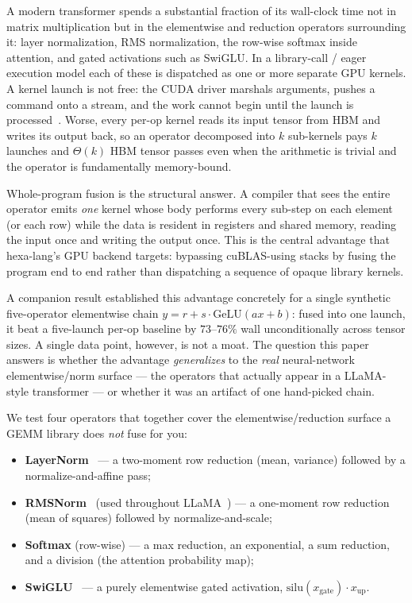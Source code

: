 \documentclass[11pt,a4paper]{article}
\begin{document}
A modern transformer spends a substantial fraction of its wall-clock time not
in matrix multiplication but in the elementwise and reduction operators
surrounding it: layer normalization, RMS normalization, the row-wise softmax
inside attention, and gated activations such as SwiGLU. In a library-call /
eager execution model each of these is dispatched as one or more separate GPU
kernels. A kernel launch is not free: the CUDA driver marshals arguments,
pushes a command onto a stream, and the work cannot begin until the launch is
processed~\citep{nvidia_cuda_driver}. Worse, every per-op kernel reads its
input tensor from HBM and writes its output back, so an operator decomposed
into $k$ sub-kernels pays $k$ launches and $\Theta(k)$ HBM tensor passes even
when the arithmetic is trivial and the operator is fundamentally
memory-bound.

Whole-program fusion is the structural answer. A compiler that sees the entire
operator emits \emph{one} kernel whose body performs every sub-step on each
element (or each row) while the data is resident in registers and shared
memory, reading the input once and writing the output once. This is the central
advantage that hexa-lang's GPU backend targets: bypassing cuBLAS-using stacks by
fusing the program end to end rather than dispatching a sequence of opaque
library kernels.

A companion result established this advantage concretely for a single synthetic
five-operator elementwise chain $y = r + s\cdot\mathrm{GeLU}(ax+b)$: fused into
one launch, it beat a five-launch per-op baseline by $73$--$76\%$ wall
unconditionally across tensor sizes. A single data point, however, is not a
moat. The question this paper answers is whether the advantage
\emph{generalizes} to the \emph{real} neural-network elementwise/norm surface
--- the operators that actually appear in a LLaMA-style transformer --- or
whether it was an artifact of one hand-picked chain.

We test four operators that together cover the elementwise/reduction surface a
GEMM library does \emph{not} fuse for you:
\begin{itemize}\itemsep0.2em
\item \textbf{LayerNorm}~\citep{ba2016layernorm} --- a two-moment row reduction
  (mean, variance) followed by a normalize-and-affine pass;
\item \textbf{RMSNorm}~\citep{zhang2019rmsnorm} (used throughout
  LLaMA~\citep{touvron2023llama}) --- a one-moment row reduction
  (mean of squares) followed by normalize-and-scale;
\item \textbf{Softmax} (row-wise) --- a max reduction, an exponential, a sum
  reduction, and a division (the attention probability map);
\item \textbf{SwiGLU}~\citep{shazeer2020glu} --- a purely elementwise gated
  activation, $\mathrm{silu}(x_{\text{gate}})\cdot x_{\text{up}}$.
\end{itemize}
\end{document}
